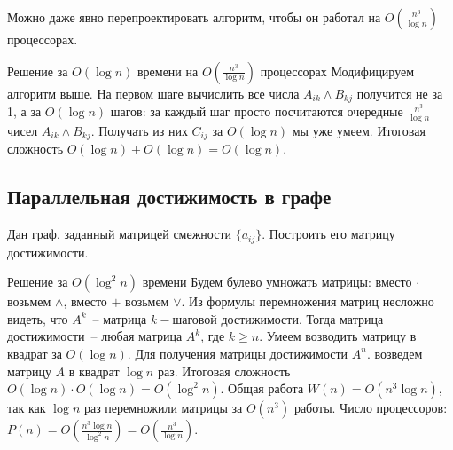 Можно даже явно перепроектировать алгоритм, чтобы он работал на $O\left(\frac{n^3}{\log n}\right)$ процессорах.

\begin{algodescription}{Решение за $O(\log n)$ времени на $O\left(\frac{n^3}{\log n}\right)$ процессорах} Модифицируем алгоритм выше. На первом шаге вычислить все числа $A_{ik}\land B_{kj}$ получится не за 1, а за $O(\log n)$ шагов: за каждый шаг просто посчитаются очередные $\frac{n^3}{\log n}$ чисел $A_{ik}\land B_{kj}$. Получать из них $C_{ij}$ за $O(\log n)$ мы уже умеем. Итоговая сложность $O(\log n) + O(\log n) = O(\log n)$.
\end{algodescription}

\subsection{Параллельная достижимость в графе}
\begin{problem*}
	Дан граф, заданный матрицей смежности $\{a_{ij}\}$. Построить его матрицу достижимости.
\end{problem*}

\begin{algodescription}{Решение за $O(\log^2 n)$ времени} Будем булево умножать матрицы: вместо $\cdot$ возьмем $\land$, вместо $+$ возьмем $\lor$. Из формулы перемножения матриц несложно видеть, что $A^k$~-- матрица $k-$шаговой достижимости. Тогда матрица достижимости~-- любая матрица $A^k$, где $k\geq n$. Умеем возводить матрицу в квадрат за $O(\log n)$. Для получения матрицы достижимости $A^n$. возведем матрицу $A$ в квадрат $\log n$ раз. Итоговая сложность $O(\log n) \cdot O(\log n) = O(\log^2 n)$. Общая работа $W(n) = O(n^3\log n)$, так как $\log n$ раз перемножили матрицы за $O(n^3)$ работы. Число процессоров: $P(n) = O\left(\frac{n^3\log n}{\log^2 n}\right) = O\left(\frac{n^3}{\log n}\right)$.
\end{algodescription}
